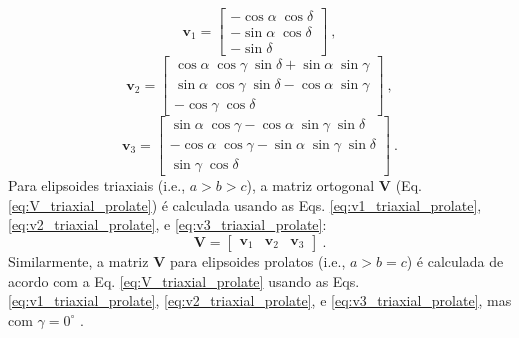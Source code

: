 \begin{equation}
\mathbf{v}_{1} = \left[\begin{array}{c} 
-\cos\alpha \; \cos\delta \\
-\sin\alpha \; \cos\delta \\
-\sin\delta
\end{array} \right] \: ,
\label{eq:v1_triaxial_prolate}
\end{equation}
\begin{equation}
\mathbf{v}_{2} = \left[\begin{array}{c} 
\cos\alpha \; \cos\gamma \; \sin\delta + \sin\alpha \; \sin\gamma \\                   
\sin\alpha \; \cos\gamma \; \sin\delta - \cos\alpha \; \sin\gamma \\ 
-\cos\gamma \; \cos\delta
\end{array} \right] \: ,
\label{eq:v2_triaxial_prolate}
\end{equation}                   
\begin{equation}                    
\mathbf{v}_{3} = \left[\begin{array}{c} 
\sin\alpha \; \cos\gamma - \cos\alpha \; \sin\gamma \; \sin\delta \\                    
-\cos\alpha \; \cos\gamma - \sin\alpha \; \sin\gamma \; \sin\delta \\
\sin\gamma \; \cos\delta
\end{array} \right] \: .
\label{eq:v3_triaxial_prolate}
\end{equation}
Para elipsoides triaxiais (i.e., $a > b > c$), a matriz ortogonal
$\mathbf{V}$ (Eq. \ref{eq:V_triaxial_prolate}) é calculada usando as Eqs.
\ref{eq:v1_triaxial_prolate}, \ref{eq:v2_triaxial_prolate}, e
\ref{eq:v3_triaxial_prolate}:
\begin{equation}
\mathbf{V} = \left[ \begin{array}{ccc}
\mathbf{v}_{1} & \mathbf{v}_{2} & \mathbf{v}_{3}
\end{array} \right] \: .
\label{eq:V_triaxial_prolate}
\end{equation}
Similarmente, a matriz $\mathbf{V}$ para elipsoides prolatos (i.e., $a > b = c$) é calculada de acordo com a Eq. \ref{eq:V_triaxial_prolate} usando as Eqs.
\ref{eq:v1_triaxial_prolate}, \ref{eq:v2_triaxial_prolate}, e
\ref{eq:v3_triaxial_prolate}, mas com $\gamma = 0^{\circ}$ 
\citep{emerson1985}.

